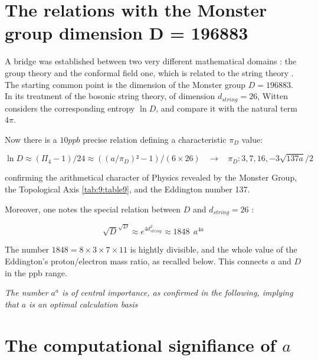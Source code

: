 \documentclass[a4paper,9pt]{article}
\begin{document}
 
 
 
 
 
 
 
 
 \section{The relations with the Monster group dimension D = 196883} 
 
A bridge was established between two very different mathematical domains : the group theory and the conformal field one, which is related to the string theory \cite{Frenkel}. The starting common point is the dimension of the Monster group $D = 196883$. In its treatment of the bosonic string theory, of dimension $d_{string} = 26$, Witten \cite{Witten} considers the corresponding entropy $\ln{D}$, and compare it with the natural term $4\pi$. 
   
Now there is a $10 ppb$ precise relation defining a characteristic $\pi_D$  value:
  
\begin{equation}
 \ln{D} \approx (\Pi_4 - 1)/24 \approx ((a/\pi_D)² - 1)/(6\times 26) ~~~~\rightarrow  ~~~~ \pi_D : 3,7,16,-3\sqrt{137a}/2
\end{equation}  
 

confirming the arithmetical character of Physics revealed by the Monster Group, the Topological Axis \ref{tab:9:table9}, and the Eddington number 137.


Moreover, one notes the special relation between $D$ and $d_{string} = 26$ :

\begin{equation}
 \sqrt D^{\sqrt D} \approx e^{4d_{string}^2} \approx 1848~~ a^{4a} 
\end{equation}  

The number $1848 = 8 \times 3 \times 7 \times 11$  is hightly divisible, and the whole value of the Eddington's proton/electron mass ratio, as recalled below. This connects $a$ and $D$ in the ppb range. 


\textit{The number $a^a$ is of central importance, as confirmed in the following, implying that $a$ is an optimal calculation basis}



     
   
   \section{The computational signifiance of $a$}
   
\end{document}
